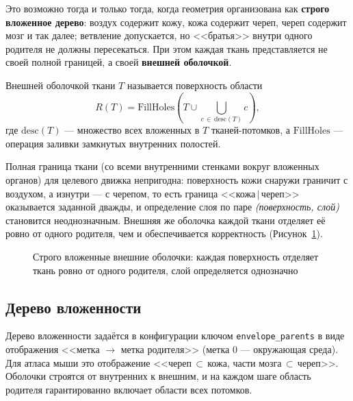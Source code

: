 \documentclass[a4paper,14pt]{article}
\begin{document}
Это возможно тогда и только тогда, когда геометрия организована как \textbf{строго вложенное дерево}: воздух содержит кожу, кожа содержит череп, череп содержит мозг и так далее; ветвление допускается, но <<братья>> внутри одного родителя не должны пересекаться. При этом каждая ткань представляется не своей полной границей, а своей \textbf{внешней оболочкой}.

\begin{definition}
Внешней оболочкой ткани $T$ называется поверхность области
\begin{equation}
    R(T) = \mathrm{FillHoles}\!\left(T \cup \bigcup_{c \,\in\, \mathrm{desc}(T)} c\right),
\end{equation}
где $\mathrm{desc}(T)$ --- множество всех вложенных в $T$ тканей-потомков, а $\mathrm{FillHoles}$ --- операция заливки замкнутых внутренних полостей.
\end{definition}

Полная граница ткани (со всеми внутренними стенками вокруг вложенных органов) для целевого движка непригодна: поверхность кожи снаружи граничит с воздухом, а изнутри --- с черепом, то есть граница <<кожа\,$|$\,череп>> оказывается заданной дважды, и определение слоя по паре \emph{(поверхность, слой)} становится неоднозначным. Внешняя же оболочка каждой ткани отделяет её ровно от одного родителя, чем и обеспечивается корректность (Рисунок~\ref{fig:nesting}).

\begin{figure}[H]
    \centering
    \caption{Строго вложенные внешние оболочки: каждая поверхность отделяет ткань ровно от одного родителя, слой определяется однозначно}
    \label{fig:nesting}
\end{figure}

\subsection{Дерево вложенности}
Дерево вложенности задаётся в конфигурации ключом \texttt{envelope\_parents} в виде отображения <<метка $\to$ метка родителя>> (метка $0$ --- окружающая среда). Для атласа мыши это отображение <<череп\,$\subset$\,кожа, части мозга\,$\subset$\,череп>>. Оболочки строятся от внутренних к внешним, и на каждом шаге область родителя гарантированно включает области всех потомков.
\end{document}

